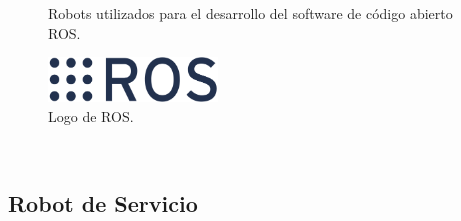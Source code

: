\begin{itemize}
  \begin{figure}[h!]
    \begin{center}
      \subcapcentertrue
      \hspace{2mm}
    \end{center}
    \caption{Robots utilizados para el desarrollo del software de código abierto ROS.}
    \label{fig:PR_ROS}
  \end{figure}
  
  \begin{figure} [h!]
    \begin{center}
      \includegraphics[width=45mm]{figs/ROS_logo.png}
    \end{center}
    \caption{Logo de ROS.}
    \label{fig:ROS}
  \end{figure}
  

  
\end{itemize}\

\pagebreak

\subsection{Robot de Servicio}
\label{sec:robot_servicio}

